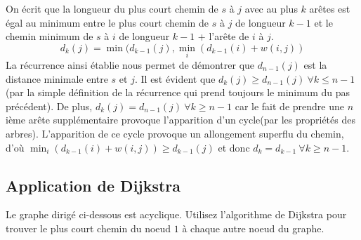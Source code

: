 \begin{solution}
On écrit que la longueur du plus court chemin de $s$ à $j$ avec au plus $k$ arêtes est égal au minimum entre le plus court chemin de $s$ à $j$ de longueur $k-1$ et le chemin minimum de $s$ à $i$ de longueur $k-1$ + l'arête de $i$ à $j$.
$$d_k(j) = \min (d_{k-1}(j) , \min_i(d_{k-1}(i)+w(i, j))$$
La récurrence ainsi établie nous permet de démontrer que $d_{n-1}(j)$ est la distance minimale entre $s$ et $j$. Il est évident que $d_k(j)\ge d_{n-1}(j)\ \forall k \le n-1$ (par la simple définition de la récurrence qui prend toujours le minimum du pas précédent). De plus, $d_k(j) = d_{n-1}(j)\ \forall k \ge n-1$ car le fait de prendre une $n$ième arête supplémentaire provoque l'apparition d'un cycle(par les propriétés des arbres). L'apparition de ce cycle provoque un allongement superflu du chemin, d'où $\min_i(d_{k-1}(i)+w(i, j)) \ge d_{k-1}(j)$ et donc $d_k = d_{k-1}\ \forall k \ge n-1$.
\end{solution}

\subsection{Application de Dijkstra} Le graphe dirigé ci-dessous est acyclique. Utilisez l'algorithme de Dijkstra pour trouver le plus court chemin du noeud $1$ à chaque autre noeud du graphe.

\begin{center}
\end{center}

